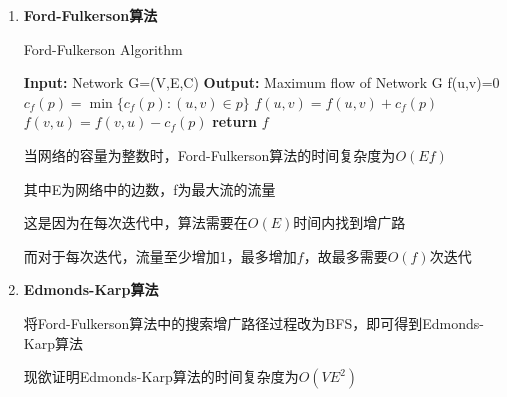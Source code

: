 \documentclass[UTF8]{ctexart}
\begin{document}
\begin{enumerate}
      \item

            \textbf{Ford-Fulkerson算法 }\cite{ford1956maximal}

            \begin{algorithm}
                  \caption{Ford-Fulkerson Algorithm}
                  \begin{algorithmic}[1]
                        \State \textbf{Input:} Network G=(V,E,C)
                        \State \textbf{Output:} Maximum flow of Network G
                        \State
                        \State f(u,v)=0
                        \EndFor
                        \State
                        \State $c_f(p)=\min\{c_f(p):(u,v)\in p\}$
                        \State $f(u,v)=f(u,v)+c_f(p)$
                        \State $f(v,u)=f(v,u)-c_f(p)$
                        \EndIf
                        \EndFor
                        \EndWhile
                        \State \textbf{return} $f$
                        \EndProcedure
                  \end{algorithmic}
            \end{algorithm}


            \vspace{0.5cm}

            当网络的容量为整数时，Ford-Fulkerson算法的时间复杂度为$O(Ef)$

            其中E为网络中的边数，f为最大流的流量

            这是因为在每次迭代中，算法需要在$O(E)$时间内找到增广路

            而对于每次迭代，流量至少增加1，最多增加$f$，故最多需要$O(f)$次迭代



            \vspace{3cm}

      \item
            \textbf{Edmonds-Karp算法}\cite{edmonds1972theoretical}

            将Ford-Fulkerson算法中的搜索增广路径过程改为BFS，即可得到Edmonds-Karp算法

            现欲证明Edmonds-Karp算法的时间复杂度为$O(VE^2)$


\end{enumerate}
\end{document}
